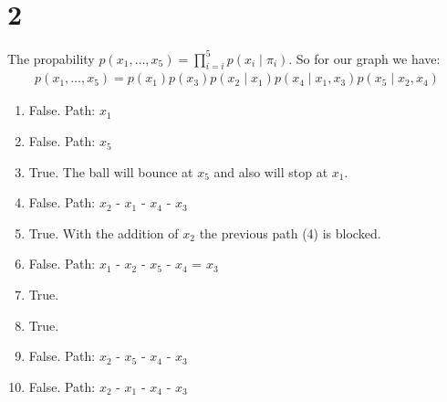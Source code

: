 \section*{2}
The propability $p(x_1,\dotsc,x_5) = \prod_{i=i}^5 p(x_i\mid \pi_i)$.
So for our graph we have:
\begin{align*}
p(x_1,\dotsc,x_5) = p(x_1)p(x_3)p(x_2\mid x_1)p(x_4\mid x_{1},x_3)p(x_5\mid x_{2},x_4)
\end{align*}
\begin{enumerate}
\item False. Path: $x_1$
\item False. Path: $x_5$
\item True. The ball will bounce at $x_5$ and also will stop at $x_1$.
\item False. Path: $x_2$ - $x_1$ - $x_4$ - $x_3$
\item True. With the addition of $x_2$ the previous path (4) is blocked.
\item False. Path: $x_1$ - $x_2$ - $x_5$ - $x_4$ = $x_3$
\item True. 
\item True.
\item False. Path: $x_2$ - $x_5$ - $x_4$ - $x_3$
\item False. Path: $x_2$ - $x_1$ - $x_4$ - $x_3$
\end{enumerate}
